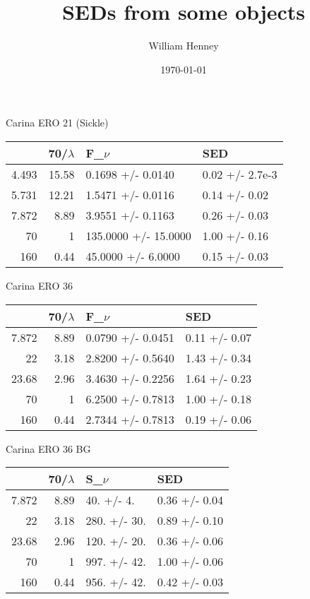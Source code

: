 \documentclass[11pt]{article}
\author{William Henney}
\date{\today}
\title{SEDs from some objects}
\begin{document}
\maketitle
Carina ERO 21 (Sickle)
\begin{center}
\begin{tabular}{rrll}
 & 70/\(\lambda\) & F\_\(\nu\) & SED\\
\hline
4.493 & 15.58 & 0.1698 +/- 0.0140 & 0.02 +/- 2.7e-3\\
5.731 & 12.21 & 1.5471 +/- 0.0116 & 0.14 +/- 0.02\\
7.872 & 8.89 & 3.9551 +/- 0.1163 & 0.26 +/- 0.03\\
70 & 1 & 135.0000 +/- 15.0000 & 1.00 +/- 0.16\\
160 & 0.44 & 45.0000 +/- 6.0000 & 0.15 +/- 0.03\\
\end{tabular}
\end{center}

Carina ERO 36
\begin{center}
\begin{tabular}{rrll}
 & 70/\(\lambda\) & F\_\(\nu\) & SED\\
\hline
7.872 & 8.89 & 0.0790 +/- 0.0451 & 0.11 +/- 0.07\\
22 & 3.18 & 2.8200 +/- 0.5640 & 1.43 +/- 0.34\\
23.68 & 2.96 & 3.4630 +/- 0.2256 & 1.64 +/- 0.23\\
70 & 1 & 6.2500 +/- 0.7813 & 1.00 +/- 0.18\\
160 & 0.44 & 2.7344 +/- 0.7813 & 0.19 +/- 0.06\\
\end{tabular}
\end{center}

Carina ERO 36 BG
\begin{center}
\begin{tabular}{rrll}
 & 70/\(\lambda\) & S\_\(\nu\) & SED\\
\hline
7.872 & 8.89 & 40. +/- 4. & 0.36 +/- 0.04\\
22 & 3.18 & 280. +/- 30. & 0.89 +/- 0.10\\
23.68 & 2.96 & 120. +/- 20. & 0.36 +/- 0.06\\
70 & 1 & 997. +/- 42. & 1.00 +/- 0.06\\
160 & 0.44 & 956. +/- 42. & 0.42 +/- 0.03\\
\end{tabular}
\end{center}
\end{document}
